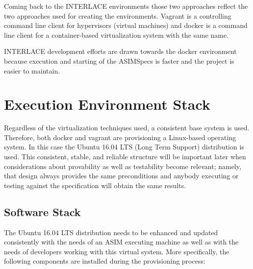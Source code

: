 Coming back to the INTERLACE environments those two approaches reflect the two approaches used for creating the environments. Vagrant is a controlling command line client for hypervisors (virtual machines) and docker is a command line client for a container-based virtualization system with the same name.

INTERLACE development efforts are drawn towards the docker environment because execution and starting of the ASIMSpecs is faster and the project is easier to maintain.


\section{Execution Environment Stack}
\label{sec:exec-env-stack}
Regardless of the virtualization techniques used, a consistent base system is used. Therefore, both docker and vagrant are provisioning a Linux-based operating system. In this case the Ubuntu 16.04 LTS (Long Term Support) distribution is used. This consistent, stable, and reliable structure will be important later when considerations about provability as well as testability become relevant; namely, that design always provides the same preconditions and anybody executing or testing against the specification will obtain the same results.

\subsection{Software Stack}
\label{sec:env-exec-stack-software-stack}

The Ubuntu 16.04 LTS distribution needs to be enhanced and updated consistently with the needs of an ASIM executing machine as well as with the needs of developers working with this virtual system. More specifically, the following components are installed during the provisioning process:

